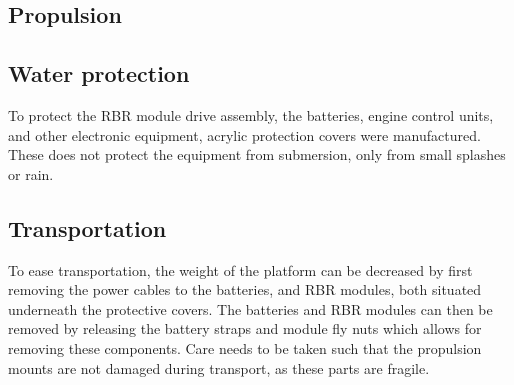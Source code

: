 \subsection{Propulsion}

\iffalse
At an early stage of development, it was chosen in consultation with an RC-expert that we should use air-propellers for propulsion, as it is better than water propellers at lower speeds. The advantages of this is simplicity of construction, cost effectiveness, and that water-electricity contact concerns are more easily managed. Furthermore air propellers will not stir up the bottom of a lake, and thus not affect the water cleaning properties of the vehicle.
Disadvantages of water propellers, such as motors intended for electric RC-boats, are that they have poor low speed maneuverability. Disadvantages of air-propulsion are the bulkier form factor, as bigger rudders and propellers are needed to propel the vehicle. There is also a safety concern as air propellers are more likely to get in contact with hands, hair, and other vulnerable body parts. To prevent some of these possible incidents to happen, an acrylic glass frame were installed around the propellers.

We chose to use two air propellers mounted in the rear of the platform together with two large rudders controlled by a single servo, the control of which is described in the controller section. The complete motor-rudder assembly was laser cut from acrylic glass which is a cheap, low weight material. However, the assembly proved to be a bit fragile, and some care was needed when handling the floating platform, to prevent damaging any of the delicate parts. Schematics and design plans can be found in the appendix.
\fi
\subsection{Water protection}
To protect the RBR module drive assembly, the batteries, engine control units, and other electronic equipment, acrylic protection covers were manufactured. These does not protect the equipment from submersion, only from small splashes or rain. 
\subsection{Transportation}
To ease transportation, the weight of the platform can be decreased by first removing the power cables to the batteries, and RBR modules, both situated underneath the protective covers. The batteries and RBR modules can then be removed by releasing the battery straps and module fly nuts which allows for removing these components. Care needs to be taken such that the propulsion mounts are not damaged during transport, as these parts are fragile.

